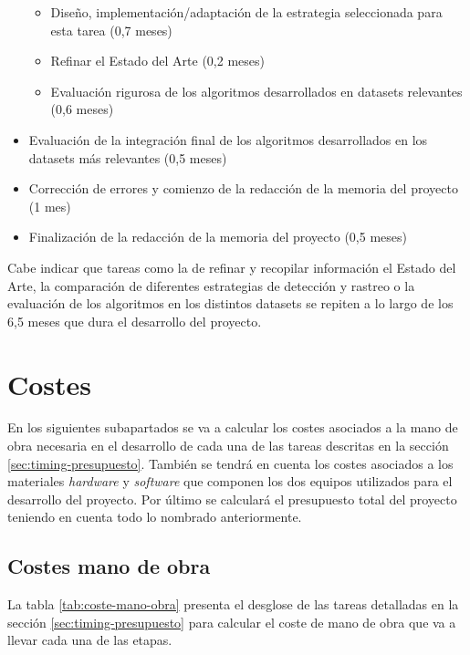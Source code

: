 \begin{itemize}
    \begin{itemize}
        \item Diseño, implementación/adaptación de la estrategia seleccionada para esta tarea (0,7 meses)
        \item Refinar el Estado del Arte (0,2 meses)
        \item Evaluación rigurosa de los algoritmos desarrollados en datasets relevantes (0,6 meses)
    \end{itemize}
    
    \item Evaluación de la integración final de los algoritmos desarrollados en los datasets más relevantes (0,5 meses)
    
    \item Corrección de errores y comienzo de la redacción de la memoria del proyecto (1 mes)
    
    \item Finalización de la redacción de la memoria del proyecto (0,5 meses)
\end{itemize}

Cabe indicar que tareas como la de refinar y recopilar información el Estado del Arte, la comparación de diferentes estrategias de detección y rastreo o la evaluación de los algoritmos en los distintos datasets se repiten a lo largo de los 6,5 meses que dura el desarrollo del proyecto.

\section{Costes}
\label{sec:costes-presupuesto}

En los siguientes subapartados se va a calcular los costes asociados a la mano de obra necesaria en el desarrollo de cada una de las tareas descritas en la sección \ref{sec:timing-presupuesto}. También se tendrá en cuenta los costes asociados a los materiales \textit{hardware} y \textit{software} que componen los dos equipos utilizados para el desarrollo del proyecto. Por último se calculará el presupuesto total del proyecto teniendo en cuenta todo lo nombrado anteriormente.

\subsection{Costes mano de obra}
\label{subsec:costes-mano-obra}

La tabla \ref{tab:coste-mano-obra} presenta el desglose de las tareas detalladas en la sección \ref{sec:timing-presupuesto} para calcular el coste de mano de obra que va a llevar cada una de las etapas.

